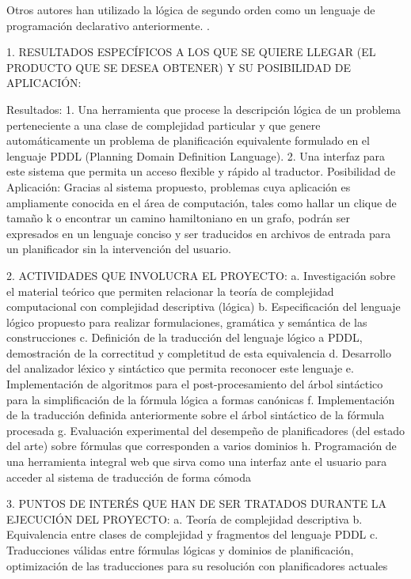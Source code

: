 Otros autores han utilizado la lógica de segundo orden como un lenguaje de
programación declarativo anteriormente. \cite{cadoli:npspec}.



1. RESULTADOS ESPECÍFICOS A LOS QUE SE QUIERE LLEGAR 
(EL PRODUCTO QUE SE DESEA OBTENER) Y SU POSIBILIDAD DE APLICACIÓN: 

Resultados:
1. Una herramienta que procese la descripción lógica de un problema perteneciente a una clase de complejidad particular y que genere automáticamente un problema de planificación equivalente formulado en el lenguaje PDDL (Planning Domain Definition Language). 
2. Una interfaz para este sistema que permita un acceso flexible y rápido al traductor.
Posibilidad de Aplicación:
Gracias al sistema propuesto, problemas cuya aplicación es ampliamente conocida
en el área de computación, tales como hallar un clique de tamaño k o encontrar un camino hamiltoniano en un grafo, podrán ser expresados en un lenguaje conciso y ser traducidos en archivos de entrada para un planificador sin la intervención del usuario.

2. ACTIVIDADES QUE INVOLUCRA EL PROYECTO: 
a. Investigación sobre el material teórico que permiten relacionar la teoría de complejidad computacional con complejidad descriptiva (lógica)
b. Especificación del lenguaje lógico propuesto para realizar formulaciones, gramática y semántica de las construcciones
c. Definición de la traducción del lenguaje lógico a PDDL, demostración de la correctitud y completitud de esta equivalencia
d. Desarrollo del analizador léxico y sintáctico que permita reconocer este lenguaje
e. Implementación de algoritmos para el post-procesamiento del árbol sintáctico para la simplificación de la fórmula lógica a formas canónicas
f. Implementación de la traducción definida anteriormente sobre el árbol sintáctico de la fórmula procesada
g. Evaluación experimental del desempeño de planificadores (del estado del arte) sobre fórmulas que corresponden a varios dominios
h. Programación de una herramienta integral web que sirva como una interfaz ante el usuario para acceder al sistema de traducción de forma cómoda

3. PUNTOS DE INTERÉS QUE HAN DE SER TRATADOS DURANTE LA EJECUCIÓN DEL PROYECTO:
a. Teoría de complejidad descriptiva
b. Equivalencia entre clases de complejidad y fragmentos del lenguaje PDDL
c. Traducciones válidas entre fórmulas lógicas y dominios de planificación, optimización de las traducciones para su resolución con planificadores actuales

\cite{russell}

